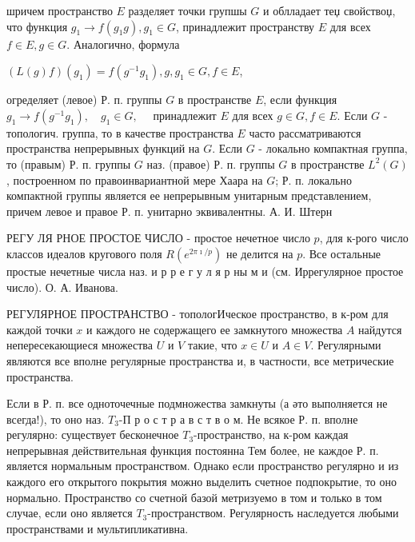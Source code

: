\documentclass[10pt]{article}
\begin{document}
шричем пространство $E$ разделяет точки групшы $G$ и облладает теџ свойствоџ, что функция $g_{1} \rightarrow f\left(g_{1} g\right), g_{1} \in G$, принадлежит пространству $E$ для всех $f \in E, g \in G$. Аналогично, формула



$(L(g) f)\left(g_{1}\right)=f\left(g^{-1} g_{1}\right), g, g_{1} \in G, f \in E$,



огределяет (левое) Р. п. группы $G$ в пространстве $E$, если функция $g_{1} \rightarrow f\left(g^{-1} g_{1}\right), \quad g_{1} \in G, \quad$ принадлежит $E$ для всех $g \in G, f \in E$. Если $G$ - топологич. группа, то в качестве пространства $E$ часто рассматриваются пространства непрерывных функций на $G$. Если $G$ - локально компактная группа, то (правым) Р. п. группы $G$ наз. (правое) Р. п. группы $G$ в пространстве $L^{2}(G)$, построенном по правоинвариантной мере Хаара на $G$; Р. п. локально компактной группы является ее непрерывным унитарным представлением, причем левое и правое Р. п. унитарно эквивалентны. А. И. Штерн



РЕГУ ЛЯ РНОЕ ПРОСТОЕ ЧИСЛО - простое нечетное число $p$, для к-рого число классов идеалов кругового поля $R\left(e^{2 \pi \imath / p}\right)$ не делится на $p$. Все остальные простые нечетные числа наз. и р р е г у л я р ны м и (см. Иррегулярное простое число). О. А. Иванова.



РЕГУЛЯРНОЕ ПРОСТРАНСТВО - топологИческое пространство, в к-ром для каждой точки $x$ и каждого не содержащего ее замкнутого множества $A$ найдутся непересекающиеся множества $U$ и $V$ такие, что $x \in U$ и $A \in V$. Регулярными являются все вполне регулярные пространства и, в частности, все метрические пространства.



Если в Р. п. все одноточечные подмножества замкнуты (а әто выполняется не всегда!), то оно наз. $T_{3}$-П р о с т р а в с т в о м. Не всякое Р. п. вполне регулярно: существует бесконечное $T_{3}$-пространство, на к-ром каждая непрерывная действительная функция постоянна Тем более, не каждое Р. п. является нормальным пространством. Однако если пространство регулярно и из каждого его открытого покрытия можно выделить счетное подпокрытие, то оно нормально. Пространство со счетной базой метризуемо в том и только в том случае, если оно является $T_{3}$-пространством. Регулярность наследуется любыми пространствами и мультипликативна.
\end{document}
